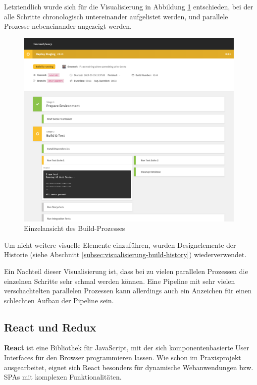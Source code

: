 Letztendlich wurde sich für die Visualisierung in Abbildung \ref{fig:pipeline-overview} entschieden, bei der alle Schritte chronologisch untereinander aufgelistet werden, und parallele Prozesse nebeneinander angezeigt werden.

\begin{figure}[h]
  \caption{Einzelansicht des Build-Prozesses}
  \label{fig:pipeline-overview}
  \centering
    \includegraphics[width=\textwidth]{assets/pipeline-overview}
\end{figure}

Um nicht weitere visuelle Elemente einzuführen, wurden Designelemente der Historie (siehe Abschnitt \ref{subsec:visualisierung-build-history}) wiederverwendet.

Ein Nachteil dieser Visualisierung ist, dass bei zu vielen parallelen Prozessen die einzelnen Schritte sehr schmal werden können. Eine Pipeline mit sehr vielen verschachtelten parallelen Prozessen kann allerdings auch ein Anzeichen für einen schlechten Aufbau der Pipeline sein.

\subsection{React und Redux}
\label{subsec:react-redux}

\textbf{React} ist eine Bibliothek für JavaScript, mit der sich komponentenbasierte User Interfaces für den Browser programmieren lassen. Wie schon im Praxisprojekt \cite{Maemecke2017} ausgearbeitet, eignet sich React besonders für dynamische Webanwendungen bzw. \acp{SPA} mit komplexen Funktionalitäten.

